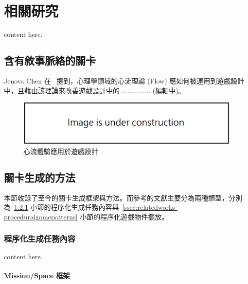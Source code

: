 \chapter{相關研究}
\label{cha:relatedworks}

content here.

\section{含有敘事脈絡的關卡}
\label{sec:flow-in-games}

Jenova Chen 在~\cite{chen2007flow} 提到，心理學領域的心流理論 (Flow) 應如何被運用到遊戲設計中，且藉由該理論來改善遊戲設計中的 ............... (編輯中)。

\begin{figure}[!htb]
  \begin{center}
    \includegraphics[width=1.0\textwidth]{figures/under_construction.png}
    \caption{心流體驗應用於遊戲設計} 
    \label{fig:flow-in-games}
  \end{center}
\end{figure}

\section{關卡生成的方法}
\label{sec:relatedworks-levelgeneration}

本節收錄了至今的關卡生成框架與方法。而參考的文獻主要分為兩種類型，分別為~\ref{ssec:relatedworks-proceduralmission} 小節的程序化生成任務內容與~\ref{ssec:relatedworks-proceduralgamepatterns} 小節的程序化遊戲物件擺放。

\subsection{程序化生成任務內容}
\label{ssec:relatedworks-proceduralmission}

content here.

\subsubsection{Mission/Space 框架}
\label{sssec:relatedworks-proceduralmission-missionspace}

